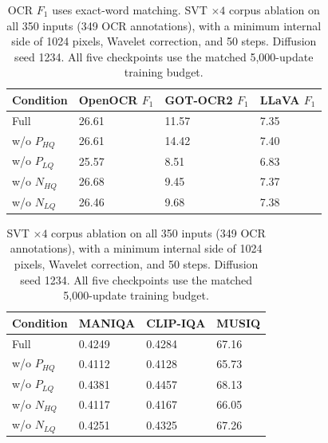 \begin{table}[H]
\centering
\caption{OCR $F_1$ uses exact-word matching. SVT $\times4$ corpus ablation on all 350 inputs (349 OCR annotations), with a minimum internal side of 1024 pixels, Wavelet correction, and 50 steps. Diffusion seed 1234. All five checkpoints use the matched 5,000-update training budget.}
\label{tab:ar-svt-corpus-ocr}
\small
\setlength{\tabcolsep}{4pt}
\begin{tabular}{llll}
\toprule
Condition & OpenOCR $F_1$ & GOT-OCR2 $F_1$ & LLaVA $F_1$ \\
\midrule
Full & 26.61 & 11.57 & 7.35 \\
w/o $P_{HQ}$ & 26.61 & 14.42 & 7.40 \\
w/o $P_{LQ}$ & 25.57 & 8.51 & 6.83 \\
w/o $N_{HQ}$ & 26.68 & 9.45 & 7.37 \\
w/o $N_{LQ}$ & 26.46 & 9.68 & 7.38 \\
\bottomrule
\end{tabular}
\end{table}

\begin{table}[H]
\centering
\caption{SVT $\times4$ corpus ablation on all 350 inputs (349 OCR annotations), with a minimum internal side of 1024 pixels, Wavelet correction, and 50 steps. Diffusion seed 1234. All five checkpoints use the matched 5,000-update training budget.}
\label{tab:ar-svt-corpus-iqa}
\small
\setlength{\tabcolsep}{4pt}
\begin{tabular}{llll}
\toprule
Condition & MANIQA & CLIP-IQA & MUSIQ \\
\midrule
Full & 0.4249 & 0.4284 & 67.16 \\
w/o $P_{HQ}$ & 0.4112 & 0.4128 & 65.73 \\
w/o $P_{LQ}$ & 0.4381 & 0.4457 & 68.13 \\
w/o $N_{HQ}$ & 0.4117 & 0.4167 & 66.05 \\
w/o $N_{LQ}$ & 0.4251 & 0.4325 & 67.26 \\
\bottomrule
\end{tabular}
\end{table}
